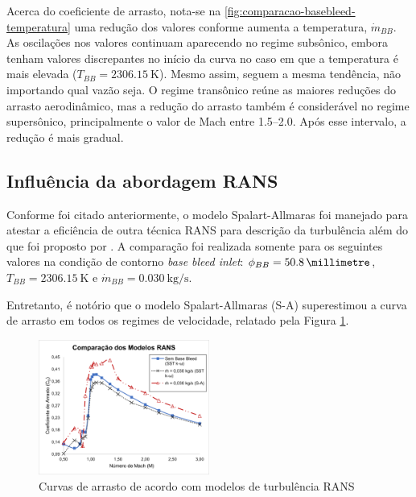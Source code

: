 Acerca do coeficiente de arrasto, nota-se na \autoref{fig:comparacao-basebleed-temperatura} uma redução dos valores conforme aumenta a temperatura, $\Dot{m}_{BB}$. As oscilações nos valores continuam aparecendo no regime subsônico, embora tenham valores discrepantes no início da curva no caso em que a temperatura é mais elevada ($T_{BB} = \qty{2306,15}{\kelvin}$). Mesmo assim, seguem a mesma tendência, não importando qual vazão seja. O regime transônico reúne as maiores reduções do arrasto aerodinâmico, mas a redução do arrasto também é considerável no regime supersônico, principalmente o valor de Mach entre \numrange{1,5}{2,0}. Após esse intervalo, a redução é mais gradual.

\subsection{Influência da abordagem RANS}\label{subsec:resultados-com-basebleed-RANS}

Conforme foi citado anteriormente, o modelo Spalart-Allmaras \cite{Spalart1992} foi manejado para atestar a eficiência de outra técnica RANS para descrição da turbulência além do que foi proposto por \citeauthor{Menter1994TwoequationET}. A comparação foi realizada somente para os seguintes valores na condição de contorno \textit{base bleed inlet}: $\phi_{BB} = \qty{50,8}{\millimetre}$, $T_{BB} = \qty{2306,15}{\kelvin}$ e $\Dot{m}_{BB} = \qty{0,030}{\kilogram\per\second}$.

Entretanto, é notório que o modelo Spalart-Allmaras (S-A) superestimou a curva de arrasto em todos os regimes de velocidade, relatado pela Figura \ref{fig:comparacao-bb-rans}.

\begin{figure}[!ht]
    \centering
    \includegraphics[width=0.5\textwidth]{cd-combasebleed-rans.png}
 	\caption{Curvas de arrasto de acordo com modelos de turbulência RANS}
    \label{fig:comparacao-bb-rans}
\end{figure}

